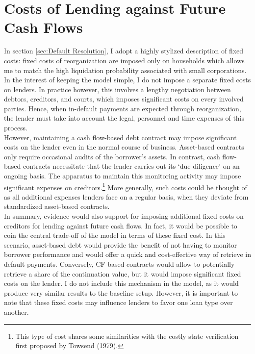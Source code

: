 \documentclass[12pt]{article}
\begin{document}
\section{Costs of Lending against Future Cash Flows \label{sec:fixed costs}}
In section \ref{sec:Default Resolution}, I adopt a highly stylized description of fixed costs: fixed costs of reorganization are imposed only on households which allows me to match the high liquidation probability associated with small corporations. In the interest of keeping the model simple, I do not impose a separate fixed costs on lenders. In practice however, this involves a lengthy negotiation between debtors, creditors, and courts, which imposes significant costs on every involved parties. Hence, when in-default payments are expected through reorganization, the lender must take into account the legal, personnel and time expenses of this process. \vspace{3mm} \\
However, maintaining a cash flow-based debt contract may impose significant costs on the lender even in the normal course of business. Asset-based contracts only require occasional audits of the borrower's assets. In contrast, cash flow-based contracts necessitate that the lender carries out its `due diligence' on an ongoing basis. The apparatus to maintain this monitoring activity may impose significant expenses on creditors.\footnote{This type of cost shares some similarities with the costly state verification first proposed by Towsend (1979).} More generally, such costs could be thought of as all additional expenses lenders face on a regular basis, when they deviate from standardized asset-based contracts.
\vspace{3mm} \\
In summary, evidence would also support for imposing additional fixed costs on creditors for lending against future cash flows. In fact, it would be possible to coin the central trade-off of the model in terms of these fixed cost. In this scenario, asset-based debt would provide the benefit of not having to monitor borrower performance and would offer a quick and cost-effective way of retrieve in default payments. Conversely, CF-based contracts would allow to potentially retrieve a share of the continuation value, but it would impose significant fixed costs on the lender. I do not include this mechanism in the model, as it would produce very similar results to the baseline setup. However, it is important to note that these fixed costs may influence lenders to favor one loan type over another.
\end{document}
